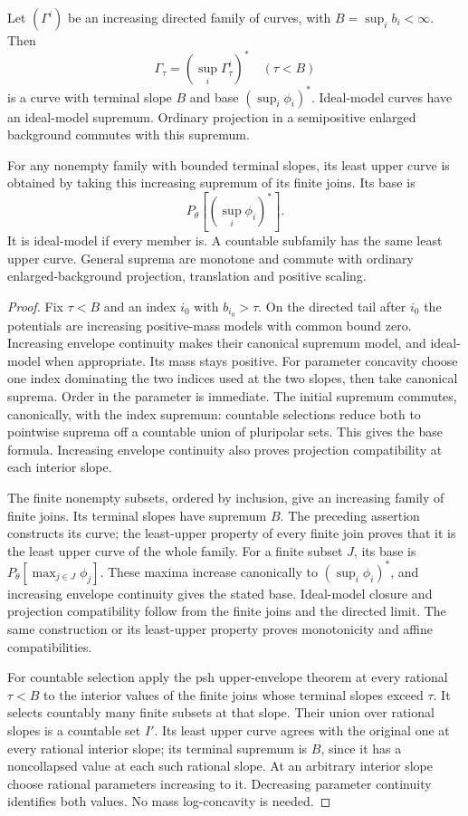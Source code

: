 \enlargethispage{3\baselineskip}
\begin{theorem}\label{thm:test-curve-suprema-and-countable-selection}
Let $(\Gamma^i)$ be an increasing directed family of curves, with $B=\sup_i b_i<\infty$. Then
\[
 \Gamma_\tau=(\sup_i\Gamma^i_\tau)^*\quad(\tau<B)
\]
is a curve with terminal slope $B$ and base $(\sup_i\phi_i)^*$. Ideal-model curves have an ideal-model supremum. Ordinary projection in a semipositive enlarged background commutes with this supremum.

For any nonempty family with bounded terminal slopes, its least upper curve is obtained by taking this increasing supremum of its finite joins. Its base is
\[
 P_\theta[(\sup_i\phi_i)^*].
\]
It is ideal-model if every member is. A countable subfamily has the same least upper curve. General suprema are monotone and commute with ordinary enlarged-background projection, translation and positive scaling.
\end{theorem}
\begin{proof}
Fix $\tau<B$ and an index $i_0$ with $b_{i_0}>\tau$. On the directed tail after $i_0$ the potentials are increasing positive-mass models with common bound zero. Increasing envelope continuity makes their canonical supremum model, and ideal-model when appropriate. Its mass stays positive. For parameter concavity choose one index dominating the two indices used at the two slopes, then take canonical suprema. Order in the parameter is immediate. The initial supremum commutes, canonically, with the index supremum: countable selections reduce both to pointwise suprema off a countable union of pluripolar sets. This gives the base formula. Increasing envelope continuity also proves projection compatibility at each interior slope.

The finite nonempty subsets, ordered by inclusion, give an increasing family of finite joins. Its terminal slopes have supremum $B$. The preceding assertion constructs its curve; the least-upper property of every finite join proves that it is the least upper curve of the whole family. For a finite subset $J$, its base is $P_\theta[\max_{j\in J}\phi_j]$. These maxima increase canonically to $(\sup_i\phi_i)^*$, and increasing envelope continuity gives the stated base. Ideal-model closure and projection compatibility follow from the finite joins and the directed limit. The same construction or its least-upper property proves monotonicity and affine compatibilities.

For countable selection apply the psh upper-envelope theorem at every rational $\tau<B$ to the interior values of the finite joins whose terminal slopes exceed $\tau$. It selects countably many finite subsets at that slope. Their union over rational slopes is a countable set $I'$. Its least upper curve agrees with the original one at every rational interior slope; its terminal supremum is $B$, since it has a noncollapsed value at each such rational slope. At an arbitrary interior slope choose rational parameters increasing to it. Decreasing parameter continuity identifies both values. No mass log-concavity is needed.
\end{proof}

